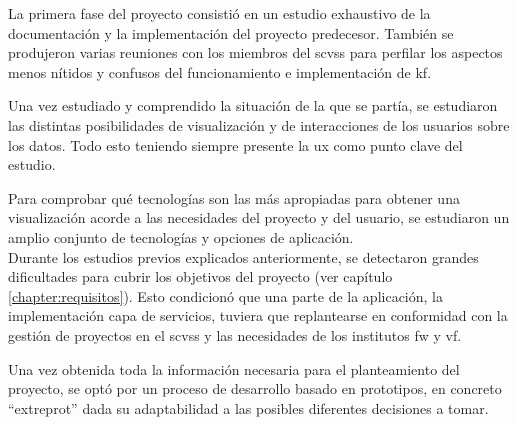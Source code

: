 \begin{itemize}
La primera fase del proyecto consistió en un estudio exhaustivo de la documentación y la implementación del proyecto predecesor. También se produjeron varias reuniones con los miembros del \gls{scvss} para perfilar los aspectos menos nítidos y confusos del funcionamiento e implementación de \gls{kf}.

Una vez estudiado y comprendido la situación de la que se partía, se estudiaron las distintas posibilidades de visualización y de interacciones de los usuarios sobre los datos. Todo esto teniendo siempre presente la \gls{ux} como punto clave del estudio. 

Para comprobar qué tecnologías son las más apropiadas para obtener una visualización acorde a las necesidades del proyecto y del usuario, se estudiaron un amplio conjunto de tecnologías y opciones de aplicación.\\ 

Durante los estudios previos explicados anteriormente, se detectaron grandes dificultades para cubrir los objetivos del proyecto (ver capítulo  \ref{chapter:requisitos}). Esto condicionó que una parte de la aplicación, la implementación capa de servicios, tuviera que replantearse 
en conformidad con la gestión de proyectos en el \gls{scvss} y las necesidades de los institutos \gls{fw} y \gls{vf}.

\end{itemize}

Una vez obtenida toda la información necesaria para el planteamiento del proyecto, se optó por un proceso de desarrollo basado en \glspl{prototipo}, en concreto ``\gls{extreprot}'' \cite{extrPro}\cite{extreprobook} dada su adaptabilidad a las posibles diferentes decisiones a tomar.


